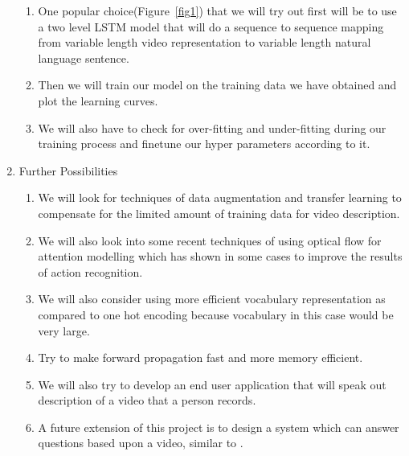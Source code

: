 \documentclass[12pt]{article}
\begin{document}
\begin{enumerate}
\begin{enumerate}
				\item
					One popular choice\cite{s2vt}(Figure~\ref{fig1}) that we will try out first will be to use a two level LSTM model that will do a sequence to sequence mapping from variable length video representation to variable length natural language sentence.
				\item
					Then we will train our model on the training data we have obtained and plot the learning curves.
				\item
					We will also have to check for over-fitting and under-fitting during our training process and finetune our hyper parameters according to it.
			\end{enumerate}
			\item Further Possibilities
			\begin{enumerate}
				\item We will look for techniques of data augmentation and transfer learning\cite{proposal} to compensate for the limited amount of training data for video description.
				\item We will also look into some recent techniques of using optical flow for attention modelling\cite{s2vt} which has shown in some cases to improve the results of action recognition.
				\item We will also consider using more efficient vocabulary representation as compared to one hot encoding because vocabulary in this case would be very large.
				\item Try to make forward propagation fast and more memory efficient.
				\item We will also try to develop an end user application that will speak out description of a video that a person records.
				\item A future extension of this project is to design a system which can answer questions based upon a video, similar to \cite{visualqa}.
			\end{enumerate}
		\end{enumerate}

	
\end{document}
